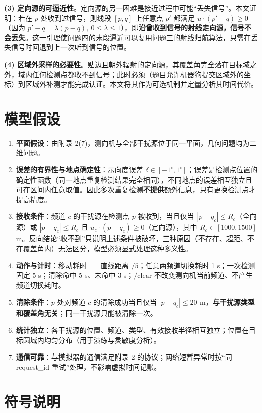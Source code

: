 \documentclass[withoutpreface,bwprint]{cumcmthesis}
\begin{document}
\textbf{(3) 定向源的可逼近性}。定向源的另一困难是接近过程中可能“丢失信号”。本文证明：若在 $p$ 处收到过信号，则线段 $[p,q]$ 上任意点 $p'$ 都满足 $u\cdot(p'-q)\ge0$（因为 $p'-q=\lambda(p-q),\ 0\le\lambda\le1$），即\textbf{沿曾收到信号的射线走向源，信号不会丢失}。这一引理使问题四的末段逼近可以复用问题三的射线归航算法，只需在丢失信号时回退到上一次听到信号的位置。

\textbf{(4) 区域外采样的必要性}。贴边且朝外辐射的定向源，其覆盖角完全落在目标域之外，域内任何检测点都收不到信号；此时必须（题目允许机器狗提交区域外的坐标）到区域外补测才能完成认证。本文将其作为可选机制并定量分析其时间代价。

\section{模型假设}

\begin{enumerate}
  \item \textbf{平面假设}：由附录 2(7)，测向机与全部干扰源位于同一平面，几何问题均为二维问题。
  \item \textbf{误差的有界性与地点确定性}：示向度误差 $\delta\in[-1^{\circ},1^{\circ}]$；误差是检测点位置的确定性函数（同一地点重复检测结果完全相同），不同地点的误差相互独立且可在区间内任意取值。因此多次重复检测\textbf{不提供}额外信息，只有更换检测点才提高精度。
  \item \textbf{接收条件}：频道 $c$ 的干扰源在检测点 $p$ 被收到，当且仅当 $|p-q_c|\le R_c$（全向源）或 $|p-q_c|\le R_c$ 且 $u_c\cdot(p-q_c)\ge0$（定向源），其中 $R_c\in[1000,1500]$ m。反向结论“收不到”只说明上述条件被破坏，三种原因（不存在、超距、不在覆盖角内）无法区分，模型必须显式处理这种多义性。
  \item \textbf{动作与计时}：移动耗时 $=$ 直线距离 $/5$；任意两频道切换耗时 1 s；一次检测固定 5 s；清除命中 5 s、未命中 3 s；$\text{/clear}$ 不改变测向机当前频道、不产生频道切换耗时。
  \item \textbf{清除条件}：$p$ 处对频道 $c$ 的清除成功当且仅当 $|p-q_c|\le20$ m，\textbf{与干扰源类型和覆盖角无关}；同一干扰源只能被清除一次。
  \item \textbf{统计独立}：各干扰源的位置、频道、类型、有效接收半径相互独立；位置在目标圆域内均匀分布（用于演练与灵敏度分析）。
  \item \textbf{通信可靠}：与模拟器的通信满足附录 2 的协议；网络短暂异常时按“同 request\_id 重试”处理，不影响虚拟时间记账。
\end{enumerate}

\section{符号说明}
\end{document}
